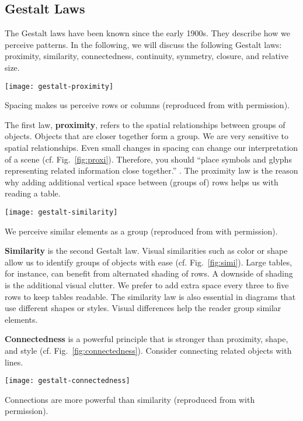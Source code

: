 \subsection{Gestalt Laws}

The Gestalt laws have been known since the early 1900s. They describe how we perceive patterns. In the following, we will discuss the following Gestalt laws: proximity, similarity, connectedness, continuity, symmetry, closure, and relative size.

\begin{marginfigure}
\centering
\texttt{[image: gestalt-proximity]}
\caption{\label{fig:proxi} Spacing makes us perceive rows or columns (reproduced from \cite{Ware12} with permission).}%
\end{marginfigure}


The first law, \textbf{proximity}, refers to the spatial relationships between groups of objects. Objects that are closer together form a group. We are very sensitive to spatial relationships. Even small changes in spacing can change our interpretation of a scene (cf. Fig.~\ref{fig:proxi}). Therefore, you should ``place symbols and glyphs representing related information close together.'' 
\cite{Ware12}. The proximity law is the reason why adding additional vertical space between (groups of) rows helps us with reading a table.

\begin{marginfigure}[-2\baselineskip]
\centering
\texttt{[image: gestalt-similarity]}
\caption{\label{fig:simi} We perceive similar elements as a group (reproduced from \cite{Ware12} with permission).}
\end{marginfigure}

\textbf{Similarity} is the second Gestalt law. Visual similarities such as color or shape allow us to identify groups of objects with ease (cf. Fig.~\ref{fig:simi}). Large tables, for instance, can benefit from alternated shading of rows. A downside of shading is the additional visual clutter. We prefer to add extra space every three to five rows to keep tables readable. The similarity law is also essential in diagrams that use different shapes or styles. Visual differences help the reader group similar elements.


\textbf{Connectedness} is a powerful principle that is stronger than proximity, shape, and style (cf. Fig.~\ref{fig:connectedness}). Consider connecting related objects with lines.
\begin{marginfigure}[-2\baselineskip]
\centering
\texttt{[image: gestalt-connectedness]}
\caption{\label{fig:connectedness} Connections are more powerful than similarity (reproduced from \cite{Ware12} with permission).}
\end{marginfigure}

